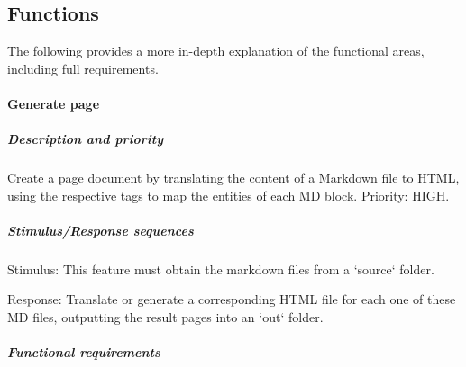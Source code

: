 \documentclass[11pt]{article}
\begin{document}
    \subsection{Functions}\label{subsec:functions}

    The following provides a more in-depth explanation of the functional areas, including full requirements.

    \paragraph{Generate page}

    \subparagraph{Description and priority}

    Create a page document by translating the content of a Markdown file to HTML, using the respective tags to map the
    entities of each MD block. Priority: HIGH.

    \subparagraph{Stimulus/Response sequences}

    Stimulus: This feature must obtain the markdown files from a `source` folder.

    Response: Translate or generate a corresponding HTML file for each one of these MD files, outputting the result pages
    into an `out` folder.

    \subparagraph{Functional requirements}
\end{document}
